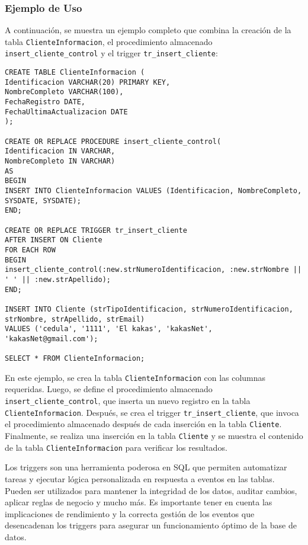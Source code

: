 \documentclass[executivepaper]{article}
\begin{document}
\subsubsection*{Ejemplo de Uso}

A continuación, se muestra un ejemplo completo que combina la creación de la tabla \texttt{ClienteInformacion}, el procedimiento almacenado \texttt{insert\_cliente\_control} y el trigger \texttt{tr\_insert\_cliente}:

\begin{lstlisting}
CREATE TABLE ClienteInformacion (
Identificacion VARCHAR(20) PRIMARY KEY,
NombreCompleto VARCHAR(100),
FechaRegistro DATE,
FechaUltimaActualizacion DATE
);

CREATE OR REPLACE PROCEDURE insert_cliente_control(
Identificacion IN VARCHAR,
NombreCompleto IN VARCHAR)
AS
BEGIN
INSERT INTO ClienteInformacion VALUES (Identificacion, NombreCompleto, SYSDATE, SYSDATE);
END;

CREATE OR REPLACE TRIGGER tr_insert_cliente
AFTER INSERT ON Cliente
FOR EACH ROW
BEGIN
insert_cliente_control(:new.strNumeroIdentificacion, :new.strNombre || ' ' || :new.strApellido);
END;

INSERT INTO Cliente (strTipoIdentificacion, strNumeroIdentificacion, strNombre, strApellido, strEmail)
VALUES ('cedula', '1111', 'El kakas', 'kakasNet', 'kakasNet@gmail.com');

SELECT * FROM ClienteInformacion;
\end{lstlisting}

En este ejemplo, se crea la tabla \texttt{ClienteInformacion} con las columnas requeridas. Luego, se define el procedimiento almacenado \texttt{insert\_cliente\_control}, que inserta un nuevo registro en la tabla \texttt{ClienteInformacion}. Después, se crea el trigger \texttt{tr\_insert\_cliente}, que invoca el procedimiento almacenado después de cada inserción en la tabla \texttt{Cliente}. Finalmente, se realiza una inserción en la tabla \texttt{Cliente} y se muestra el contenido de la tabla \texttt{ClienteInformacion} para verificar los resultados.

Los triggers son una herramienta poderosa en SQL que permiten automatizar tareas y ejecutar lógica personalizada en respuesta a eventos en las tablas. Pueden ser utilizados para mantener la integridad de los datos, auditar cambios, aplicar reglas de negocio y mucho más. Es importante tener en cuenta las implicaciones de rendimiento y la correcta gestión de los eventos que desencadenan los triggers para asegurar un funcionamiento óptimo de la base de datos.
\end{document}
